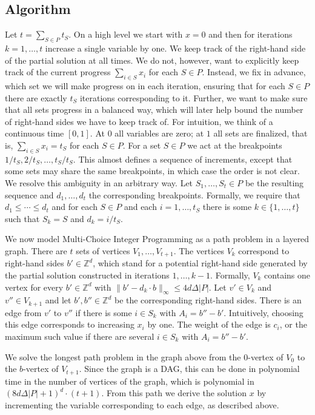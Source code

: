 \documentclass{article}
\newcommand{\Z}{\mathbb{Z}}
\begin{document}
\subsection{Algorithm}\label{sec:steinitz-alg}
Let $t = \sum_{S\in P} t_S$.
On a high level we start with $x = 0$ and then for iterations $k=1,\dotsc,t$ increase a single variable by one.
We keep track of the right-hand side of the partial solution at all times. We do not, however, want to
explicitly keep track of the current progress $\sum_{i\in S} x_i$ for each $S\in P$.
Instead, we fix in advance, which set we will make progress on in each iteration, ensuring that for each $S\in P$
there are exactly $t_S$ iterations corresponding to it.
Further, we want to make sure that all sets progress in a balanced way, which will later help bound the number
of right-hand sides we have to keep track of.
For intuition, we think of a continuous time $[0, 1]$. At $0$ all variables are zero; at $1$ all
sets are finalized, that is, $\sum_{i\in S} x_i = t_S$ for each $S\in P$.
For a set $S\in P$ we act at the breakpoints $1/t_S, 2/t_S,\dotsc,t_S/t_S$.
This almost defines a sequence of increments, except that some sets may share the same breakpoints, in which
case the order is not clear.
We resolve this ambiguity in an arbitrary way.
Let $S_1,\dotsc,S_t \in P$ be the resulting sequence and $d_1,\dotsc,d_t$ the corresponding breakpoints.
Formally, we require that $d_1\le \cdots \le d_t$ and for each $S\in P$ and each $i=1,\dotsc,t_S$ there
is some $k \in \{1,\dotsc,t\}$ such that $S_k = S$ and $d_k = i/t_S$.

We now model Multi-Choice Integer Programming as a path problem in a layered graph. There are $t$ sets
of vertices $V_1,\dotsc,V_{t+1}$. The vertices $V_k$ correspond to right-hand sides $b'\in \Z^d$,
which stand for a potential right-hand side generated by the partial solution constructed in iterations $1,\dotsc,k-1$.
Formally,
$V_k$ contains one vertex for every $b'\in \Z^d$ with $\|b' - d_k \cdot b \|_{\infty}\le 4 d\Delta |P|$.
Let $v'\in V_k$ and $v'' \in V_{k+1}$ and let $b', b'' \in \Z^d$ be the corresponding right-hand sides.
There is an edge from $v'$ to $v''$ if there is some $i\in S_k$ with $A_i = b'' - b'$.
Intuitively, choosing this edge corresponds to increasing $x_i$ by one. The weight of the edge is $c_i$,
or the maximum such value if there are several $i\in S_k$ with $A_i = b'' - b'$.

We solve the longest path problem in the graph above from the $0$-vertex of $V_0$ to the $b$-vertex of $V_{t+1}$.
Since the graph is a DAG, this can be done in polynomial time in the number of vertices of the graph, which
is polynomial in $(8 d\Delta |P| + 1)^d \cdot (t+1)$.
From this path we derive the solution $x$ by incrementing the variable corresponding to each edge, as described above.
\end{document}
